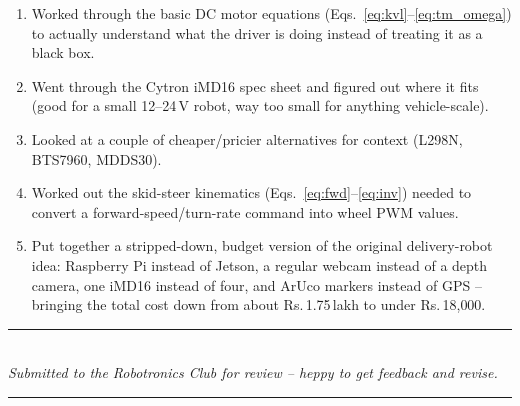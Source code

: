 \documentclass[12pt,a4paper]{article}
\begin{document}
\begin{enumerate}
    \item Worked through the basic DC motor equations (Eqs.~\eqref{eq:kvl}--\eqref{eq:tm_omega})
    to actually understand what the driver is doing instead of treating it as a black box.
    \item Went through the Cytron iMD16 spec sheet and figured out where it fits (good for
    a small 12--24\,V robot, way too small for anything vehicle-scale).
    \item Looked at a couple of cheaper/pricier alternatives for context (L298N, BTS7960,
    MDDS30).
    \item Worked out the skid-steer kinematics (Eqs.~\eqref{eq:fwd}--\eqref{eq:inv}) needed
    to convert a forward-speed/turn-rate command into wheel PWM values.
    \item Put together a stripped-down, budget version of the original delivery-robot idea:
    Raspberry Pi instead of Jetson, a regular webcam instead of a depth camera, one iMD16
    instead of four, and ArUco markers instead of GPS -- bringing the total cost down from
    about Rs.\,1.75\,lakh to under Rs.\,18{,}000.
\end{enumerate}

\vspace{1.5em}
\begin{center}
{\color{iitmBlue}\rule{0.6\linewidth}{1pt}}\\[0.5em]
\textit{Submitted to the Robotronics Club for review -- heppy to get feedback and revise.}\\[0.3em]
{\color{iitmGold}\rule{0.6\linewidth}{0.5pt}}
\end{center}
\end{document}
